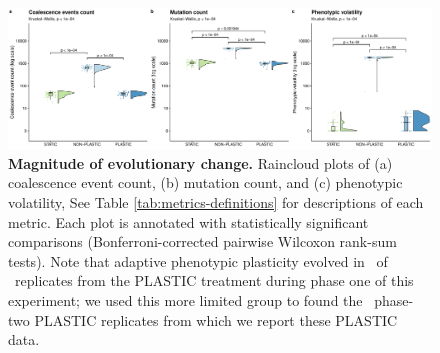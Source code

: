 
\begin{figure}[h!]
    \centering
    \includegraphics[width=1\textwidth]{media/evolutionary-change-magnitude-panel.pdf}
    \caption{\small
    \textbf{Magnitude of evolutionary change.}
    Raincloud plots \citep{allen_raincloud_2019} of 
    (a) coalescence event count, 
    (b) mutation count, 
    and (c) phenotypic volatility, 
    See Table \ref{tab:metrics-definitions} for descriptions of each metric.
    Each plot is annotated with statistically significant comparisons (Bonferroni-corrected pairwise Wilcoxon rank-sum tests).
    Note that adaptive phenotypic plasticity evolved in \evolutionaryChangeRatePlasticReps\ of \evolutionaryChangeRateReplicates\ replicates from the PLASTIC treatment during phase one of this experiment; we used this more limited group to found the \evolutionaryChangeRatePlasticReps\ phase-two PLASTIC replicates from which we report these PLASTIC data.
    }
    \label{fig:evolutionary-dynamics-magnitude}
\end{figure}